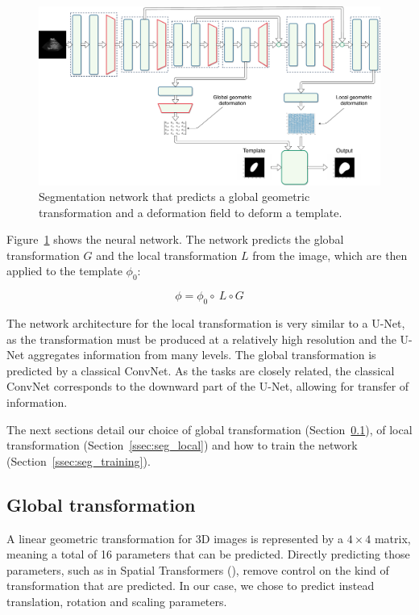 \begin{figure}[htbp]
	\includegraphics[width=\textwidth]{img_seg/deformation_network}
    \caption{Segmentation network that predicts a global geometric transformation and a deformation field to deform a template.}
    \label{fig:deform_network}
\end{figure}

Figure~\ref{fig:deform_network} shows the neural network. The network predicts the global transformation $G$ and the local transformation $L$ from the image, which are then applied to the template $\phi_0$:

\begin{equation}
    \phi = \phi_0 \circ \ L \circ G
\end{equation}

The network architecture for the local transformation is very similar to a U-Net, as the transformation must be produced at a relatively high resolution and the U-Net aggregates information from many levels. The global transformation is predicted by a classical ConvNet. As the tasks are closely related, the classical ConvNet corresponds to the downward part of the U-Net, allowing for transfer of information.

The next sections detail our choice of global transformation (Section~\ref{ssec:seg_global}), of local transformation (Section~\ref{ssec:seg_local}) and how to train the network (Section~\ref{ssec:seg_training}).

\subsection{Global transformation}
\label{ssec:seg_global}

A linear geometric transformation for 3D images is represented by a $4 \times 4$ matrix, meaning a total of 16 parameters that can be predicted. Directly predicting those parameters, such as in Spatial Transformers (\textcite{jaderberg2015NIPS}), remove control on the kind of transformation that are predicted. In our case, we chose to predict instead translation, rotation and scaling parameters. 

